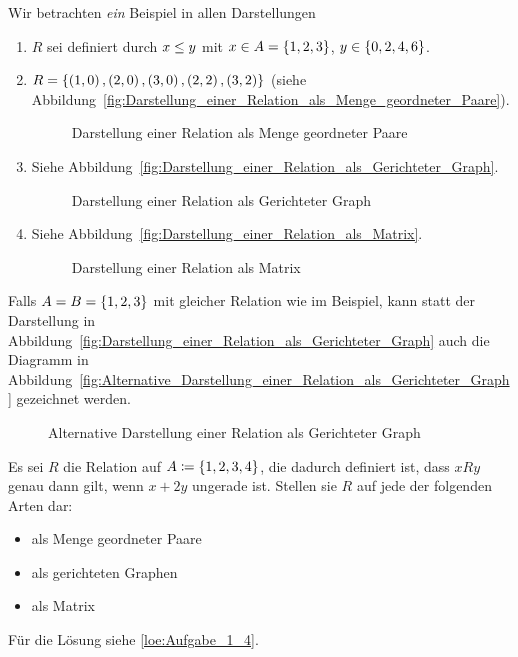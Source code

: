 \begin{example}
Wir betrachten \emph{ein} Beispiel in allen Darstellungen
\begin{enumerate}
\item $R$ sei definiert durch $x \leq y$ mit $x \in A = \left\{1, 2, 3\right\}$, $y \in \left\{0, 2, 4, 6\right\}$.
\item $R = \left\{\left(1,0\right), \left(2,0\right), \left(3,0\right), \left(2,2\right), \left(3,2\right)\right\}$ (siehe Abbildung~\vref{fig:Darstellung_einer_Relation_als_Menge_geordneter_Paare}).
	\begin{figure}[htb]
	\centering
	
	\caption{Darstellung einer Relation als Menge geordneter Paare}
	\label{fig:Darstellung_einer_Relation_als_Menge_geordneter_Paare}
	\end{figure}

\item Siehe Abbildung~\vref{fig:Darstellung_einer_Relation_als_Gerichteter_Graph}.
	\begin{figure}[htb]
	\centering
	
	\caption{Darstellung einer Relation als Gerichteter Graph}
	\label{fig:Darstellung_einer_Relation_als_Gerichteter_Graph}
	\end{figure}

\item Siehe Abbildung~\vref{fig:Darstellung_einer_Relation_als_Matrix}.
	\begin{figure}[htb]
	\centering
	
	\caption{Darstellung einer Relation als Matrix}
	\label{fig:Darstellung_einer_Relation_als_Matrix}
	\end{figure}
\end{enumerate}
\end{example}

\begin{note}
Falls $A = B = \left\{1, 2, 3\right\}$ mit gleicher Relation wie im Beispiel, kann statt der Darstellung in Abbildung~\vref{fig:Darstellung_einer_Relation_als_Gerichteter_Graph} auch die Diagramm in Abbildung~\vref{fig:Alternative_Darstellung_einer_Relation_als_Gerichteter_Graph} gezeichnet werden.
\begin{figure}[htb]
\centering

\caption{Alternative Darstellung einer Relation als Gerichteter Graph}
\label{fig:Alternative_Darstellung_einer_Relation_als_Gerichteter_Graph}
\end{figure}
\end{note}

\begin{exercise}
Es sei $R$ die Relation auf $A \mathrel{\mathop:\!\!=} \left\{1, 2, 3, 4\right\}$, die dadurch definiert ist, dass $xRy$ genau dann gilt, wenn $x + 2y$ ungerade ist. Stellen sie $R$ auf jede der folgenden Arten dar:
\begin{itemize}
\item als Menge geordneter Paare
\item als gerichteten Graphen
\item als Matrix
\end{itemize}
Für die Lösung siehe \vref{loe:Aufgabe_1_4}.
\label{exc:Aufgabe_1_4}
\end{exercise}

